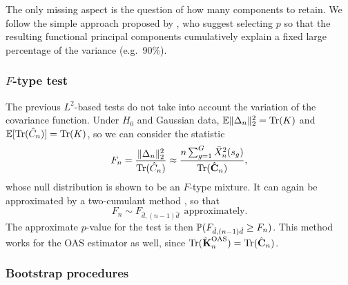 The only missing aspect is the question of how many components to retain. We follow the simple approach proposed by \citet{ramsay2005functional}, who suggest selecting \(p\) so that the resulting functional principal components cumulatively explain a fixed large percentage of the variance (e.g.\ 90\%).

\subsubsection*{\(F\)-type test}

The previous \(L^2\)-based tests do not take into account the variation of the covariance function. Under \(H_0\) and Gaussian data, \(\mathbb{E}\|\Delta_n\|^2_2 = \operatorname{Tr}(K)\) and \(\mathbb{E}[\operatorname{Tr}(\hat{C}_n)] = \operatorname{Tr}(K)\), so we can consider the statistic
\[
F_n = \frac{\|\Delta_n\|^2_2}{\operatorname{Tr}(\hat C_n)} \approx \frac{n\sum_{g=1}^G \bar{X}_n^2(s_g)}{\operatorname{Tr}(\hat{\mathbf C}_n)},
\]
whose null distribution is shown to be an \(F\)-type mixture. It can again be approximated by a two-cumulant method \citep[\S4.4]{zhang2013analysis}, so that
\[
F_n \sim F_{\hat d, (n-1)\hat d}\  \ \text{approximately}.
\]
The approximate \(p\)-value for the test is then \(\mathbb{P}(F_{\hat d, (n-1)\hat d} \geq F_n)\). This method works for the \acs{OAS} estimator as well, since \(\tr(\hatbfKnOAS)=\tr(\hat{\mathbf C}_n)\).

\subsubsection*{Bootstrap procedures}

